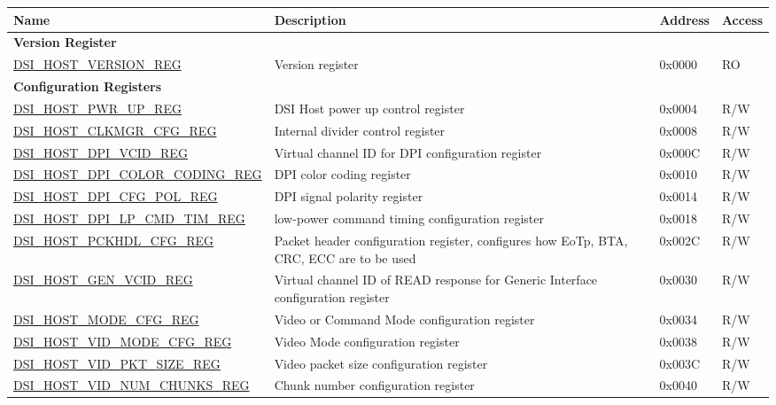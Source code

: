 \begin{longtable}{ | p{6.8cm} | p{7.2cm} | p{1.3cm} | p{1cm} | }
\hline\rowcolor{lightgray}
Name & Description &  Address & Access \\ \hline
\endhead
\multicolumn{4}{|l|}{\textbf{Version Register}} \\ \hline
\hyperref[regdesc:DSIHOSTVERSIONREG]{DSI\_HOST\_VERSION\_REG} & Version register & 0x0000 & RO \\ \hline
\multicolumn{4}{|l|}{\textbf{Configuration Registers}} \\ \hline
\hyperref[regdesc:DSIHOSTPWRUPREG]{DSI\_HOST\_PWR\_UP\_REG} & DSI Host power up control register & 0x0004 & R/W \\ \hline
\hyperref[regdesc:DSIHOSTCLKMGRCFGREG]{DSI\_HOST\_CLKMGR\_CFG\_REG} & Internal divider control register & 0x0008 & R/W \\ \hline
\hyperref[regdesc:DSIHOSTDPIVCIDREG]{DSI\_HOST\_DPI\_VCID\_REG} & Virtual channel ID for DPI configuration register & 0x000C & R/W \\ \hline
\hyperref[regdesc:DSIHOSTDPICOLORCODINGREG]{DSI\_HOST\_DPI\_COLOR\_CODING\_REG} & DPI color coding register & 0x0010 & R/W \\ \hline
\hyperref[regdesc:DSIHOSTDPICFGPOLREG]{DSI\_HOST\_DPI\_CFG\_POL\_REG} & DPI signal polarity register & 0x0014 & R/W \\ \hline
\hyperref[regdesc:DSIHOSTDPILPCMDTIMREG]{DSI\_HOST\_DPI\_LP\_CMD\_TIM\_REG} & low-power command timing configuration register & 0x0018 & R/W \\ \hline
\hyperref[regdesc:DSIHOSTPCKHDLCFGREG]{DSI\_HOST\_PCKHDL\_CFG\_REG} & Packet header configuration register, configures how EoTp, BTA, CRC, ECC are to be used & 0x002C & R/W \\ \hline
\hyperref[regdesc:DSIHOSTGENVCIDREG]{DSI\_HOST\_GEN\_VCID\_REG} & Virtual channel ID of READ response for Generic Interface configuration register & 0x0030 & R/W \\ \hline
\hyperref[regdesc:DSIHOSTMODECFGREG]{DSI\_HOST\_MODE\_CFG\_REG} & Video or Command Mode configuration register & 0x0034 & R/W \\ \hline
\hyperref[regdesc:DSIHOSTVIDMODECFGREG]{DSI\_HOST\_VID\_MODE\_CFG\_REG} & Video Mode configuration register & 0x0038 & R/W \\ \hline
\hyperref[regdesc:DSIHOSTVIDPKTSIZEREG]{DSI\_HOST\_VID\_PKT\_SIZE\_REG} & Video packet size configuration register & 0x003C & R/W \\ \hline
\hyperref[regdesc:DSIHOSTVIDNUMCHUNKSREG]{DSI\_HOST\_VID\_NUM\_CHUNKS\_REG} & Chunk number configuration register & 0x0040 & R/W \\ \hline

\end{longtable}
